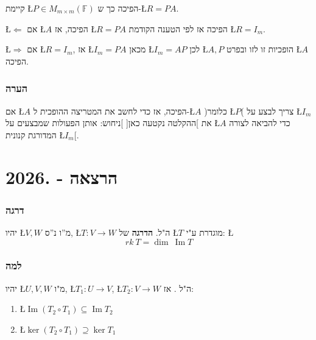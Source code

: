 \documentclass[english,hebrew]{article}
\begin{document}
קיימת \L{$P\in M_{m\times m}(\mathbb{F})$} הפיכה כך ש-\L{$R=PA$}.

\L{$\Leftarrow$} אם \L{$A$} הפיכה, אז \L{$R=PA$} הפיכה אז לפי הטענה
הקודמת \L{$R=I_{m}$}.

\L{$\Rightarrow$} אם \L{$R=I_{m}$}, אז \L{$I_{m}=PA$} מכאן \L{$I_{m}=AP$}
לכן \L{$A,P$} הופכיות זו לזו ובפרט \L{$A$} הפיכה.

\section{הערה}

אם \L{$A$} הפיכה, אז כדי לחשב את המטריצה ההופכית ל-\L{$A$} )כלומר
\L{$P$}( צריך לבצע על \L{$I_{m}$} את {]}ההקלטה נקטעה כאן{[} {]}ניחוש:
אותן הפעולות שמבצעים על \L{$A$} כדי להביאה לצורה המדורגת קנונית \L{$I_{m}$}{[}.

\newpage{}

\noindent{}

\part{הרצאה {\endL} - {.2026\endL}}

\section{דרגה}

יהיו \L{$V,W$} מ\textquotedblright ו נ\textquotedblright ס, \L{$T:V\to W$}
ה"ל. \textbf{הדרגה} של \L{$T$} מוגדרת ע"י: \L{%
\[
rk\ T=\dim\ \operatorname{Im}T
\]
}%

\section{למה}

יהיו \L{$U,V,W$} מ"ו, \L{$T_{1}:U\to V$}, \L{$T_{2}:V\to W$} ה"ל
. אז: 
\begin{enumerate}
\item \L{$\operatorname{Im}(T_{2}\circ T_{1})\subseteq\operatorname{Im}T_{2}$} 
\item \L{$\ker(T_{2}\circ T_{1})\supseteq\ker T_{1}$} 
\end{enumerate}
\end{document}
